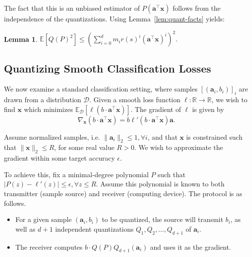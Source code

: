 \documentclass{article}
\newcommand{\R}{\mathbb{R}}
\renewcommand{\vec}[1]{\mathbf{#1}}
\def\E{\mathbb{E}}
\newtheorem{lemma}{Lemma}
\begin{document}
\vspace{-1em}
The fact that this is an unbiased estimator of $P( \vec{a}^\top \vec{x} )$ follows from the independence of the quantizations. Using Lemma~\ref{lem:quant-facts} yields:

\vspace{-0.5em}
\begin{lemma}
\label{lem:poly-sec-moment-bound}
	$\E[ Q(P)^2 ] \leq \left(\sum_{i = 0}^d m_i r(s)^i (\vec{a}^\top \vec{x})^i\right)^2.$
\end{lemma} 
\vspace{-0.5em}


\vspace{-0.5em}
\subsection{Quantizing Smooth Classification Losses}
\vspace{-0.5em}

We now examine a standard classification setting, where samples $[(\vec{a}_i, b_i)]_i$ are drawn from a distribution $\mathcal{D}$. Given a smooth loss function $\ell: \R \rightarrow \R$, we wish to find $\vec{x}$ which minimizes $\E_{\mathcal{D}} [ \ell( b \cdot \vec{a}^\top \vec{x}) ]$. The gradient of $\ell$ is given by 
$$ \nabla_\vec{x} (b \cdot \vec{a}^\top \vec{x}) = b \ell' (b \cdot \vec{a}^\top \vec{x}) \vec{a}.$$

Assume normalized samples, i.e. $\| \vec{a}_i \|_2 \leq 1, \forall i$, and that $\vec{x}$ is constrained such that $\| \vec{x} \|_2 \leq R$, for some real value $R > 0$. We wish to approximate the gradient within some target accuracy $\epsilon$. 

\vspace{-0.5em}
To achieve this, fix a minimal-degree polynomial $P$ such that $|P(z) - \ell'(z)| \leq \epsilon, \forall z \leq R$. Assume this polynomial is known to both transmitter (sample source) and receiver (computing device). The protocol is as follows. 
\vspace{-0.5em}
\begin{itemize}
    \vspace{-0.5em}
	\item For a given sample $(\vec{a}_i, b_i)$ to be quantized, the source will transmit $b_i$, as well as $d + 1$ independent quantizations $Q_1, Q_2, \ldots, Q_{d + 1}$ of $\vec{a}_i$. 
    \vspace{-0.5em}
	\item The receiver computes $b \cdot Q(P) Q_{d + 1} ( \vec{a}_i )$ and uses it as the gradient.
\end{itemize}
\end{document}
